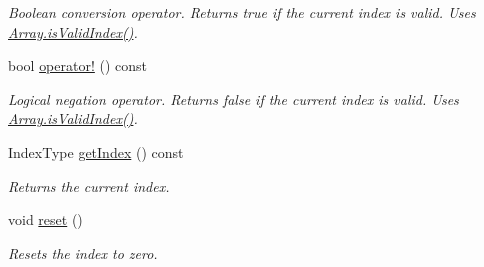 \begin{DoxyCompactItemize}
\begin{DoxyCompactList}\small\item\em Boolean conversion operator. Returns true if the current index is valid. Uses \mbox{\hyperlink{class_arcana_1_1_array_a0b1c26013b63c374bc9e980e364d6e14}{Array.\+is\+Valid\+Index()}}. \end{DoxyCompactList}\item 
\mbox{\label{class_arcana_1_1_indexed_container_iterator_a2ae1b46ef9ed0bd49688b9537f131db5}} 
bool \mbox{\hyperlink{class_arcana_1_1_indexed_container_iterator_a2ae1b46ef9ed0bd49688b9537f131db5}{operator!}} () const
\begin{DoxyCompactList}\small\item\em Logical negation operator. Returns false if the current index is valid. Uses \mbox{\hyperlink{class_arcana_1_1_array_a0b1c26013b63c374bc9e980e364d6e14}{Array.\+is\+Valid\+Index()}}. \end{DoxyCompactList}\item 
\mbox{\label{class_arcana_1_1_indexed_container_iterator_a3b5249b938cb2de4e2006507e798bc3f}} 
Index\+Type \mbox{\hyperlink{class_arcana_1_1_indexed_container_iterator_a3b5249b938cb2de4e2006507e798bc3f}{get\+Index}} () const
\begin{DoxyCompactList}\small\item\em Returns the current index. \end{DoxyCompactList}\item 
\mbox{\label{class_arcana_1_1_indexed_container_iterator_ac7e898263ea6deccf714b8f7ed72e9e9}} 
void \mbox{\hyperlink{class_arcana_1_1_indexed_container_iterator_ac7e898263ea6deccf714b8f7ed72e9e9}{reset}} ()
\begin{DoxyCompactList}\small\item\em Resets the index to zero. \end{DoxyCompactList}\end{DoxyCompactItemize}
